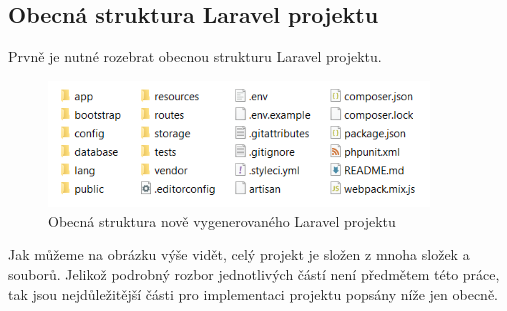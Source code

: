 	\subsection{Obecná struktura Laravel projektu}
	Prvně je nutné rozebrat obecnou strukturu Laravel projektu. 
		\begin{figure}[H]
			\centering %
			\includegraphics[width=0.9\textwidth]{img/laravel_struktura.png} %
			\caption{Obecná struktura nově vygenerovaného Laravel projektu} %
			\label{fig:laravel_str} %
		\end{figure}
	Jak můžeme na obrázku výše vidět, celý projekt je složen z mnoha složek a souborů. Jelikož podrobný rozbor jednotlivých částí není předmětem této práce, tak jsou nejdůležitější části pro implementaci projektu popsány níže jen obecně.
